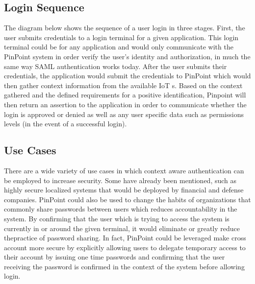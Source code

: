 \documentclass[11pt,journal]{IEEEtran}
\begin{document}
\subsection{Login Sequence}
The diagram below shows the sequence of a user login in three stages.  First, the user submits credentials to a login terminal for a given application.  This login terminal could be for any application and would only communicate with the PinPoint system in order verify the user’s identity and authorization, in much the same way SAML authentication works today.  After the user submits their credentials, the application would submit the credentials to PinPoint which would then gather context information from the available IoT s.  Based on the context gathered and the defined requirements for a positive identification, Pinpoint will then return an assertion to the application in order to communicate whether the login is approved or denied as well as any user specific data such as permissions levels (in the event of a successful login).

\subsection{Use Cases}
There are a wide variety of use cases in which context aware authentication can be employed to increase security.  Some have already been mentioned, such as highly secure localized systems that would be deployed by financial and defense companies.  PinPoint could also be used to change the habits of organizations that commonly share passwords between users which reduces accountability in the system.  By confirming that the user which is trying to access the system is currently in or around the given terminal, it would eliminate or greatly reduce thepractice of password sharing.  In fact, PinPoint could be leveraged make cross account more secure by explicitly allowing users to delegate temporary access to their account by issuing one time passwords and confirming that the user receiving the password is confirmed in the context of the system before allowing login.



\end{document}
